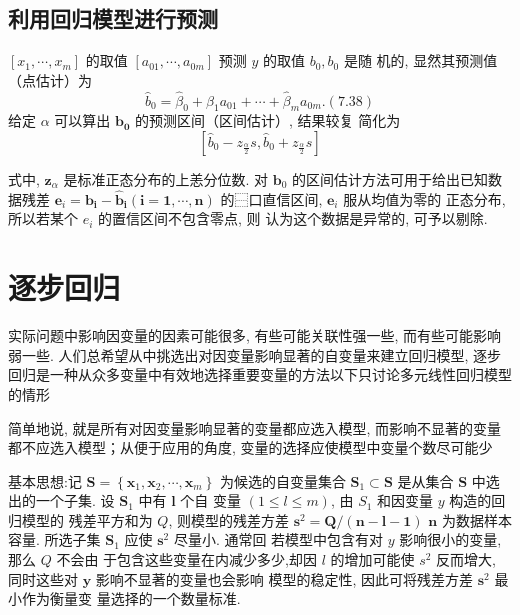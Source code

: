 \subsection{利用回归模型进行预测}

\( \left[x_{1}, \cdots, x_{m}\right] \) 的取值 \( \left[a_{01}, \cdots, a_{0 m}\right] \) 预测 \( y \) 的取值 \( b_{0}, b_{0} \) 是随 机的, 显然其预测值（点估计）为
$$
\hat{b}_{0}=\hat{\beta}_{0}+\hat{\beta}_{1} a_{01}+\cdots+\hat{\beta}_{m} a_{0 m} .(7.38)
$$
给定 \( \alpha \) 可以算出 \( \boldsymbol{b}_{\mathbf{0}} \) 的预测区间（区间估计）, 结果较复
简化为
$$
\left[\hat{b}_{0}-z_{\frac{\alpha}{2}} s, \hat{b}_{0}+z_{\frac{\alpha}{2}} s\right]
$$

式中, \( \boldsymbol{z}_{\alpha} \) 是标准正态分布的上恙分位数. 
对 \( \boldsymbol{b}_{0} \) 的区间估计方法可用于给出已知数据残差 \( \boldsymbol{e}_{i}=\boldsymbol{b}_{\boldsymbol{i}}-\hat{\boldsymbol{b}}_{\boldsymbol{i}}(\boldsymbol{i}=\mathbf{1}, \cdots, \boldsymbol{n}) \) 的⿱口直信区间, \( \boldsymbol{e}_{i} \) 服从均值为零的
正态分布, 所以若某个 \( e_{i} \) 的置信区间不包含零点, 则 认为这个数据是异常的, 可予以剔除. 

\section{逐步回归}

实际问题中影响因变量的因素可能很多, 有些可能关联性强一些, 而有些可能影响弱一些. 人们总希望从中挑选出对因变量影响显著的自变量来建立回归模型, 逐步回归是一种从众多变量中有效地选择重要变量的方法以下只讨论多元线性回归模型的情形

简单地说, 就是所有对因变量影响显著的变量都应选入模型, 而影响不显著的变量都不应选入模型；从便于应用的角度, 变量的选择应使模型中变量个数尽可能少

基本思想:记 \( \boldsymbol{S}=\left\{\boldsymbol{x}_{1}, \boldsymbol{x}_{2}, \cdots, \boldsymbol{x}_{m}\right\} \) 为候选的自变量集合
\( \boldsymbol{S}_{1} \subset \boldsymbol{S} \) 是从集合 \( \boldsymbol{S} \) 中选出的一个子集. 设 \( \boldsymbol{S}_{1} \) 中有 \( \boldsymbol{l} \) 个自
变量 \( (1 \leq l \leq m) \), 由 \( S_{1} \) 和因变量 \( y \) 构造的回归模型的 残差平方和为 \( Q \), 则模型的残差方差 \( \boldsymbol{s}^{2}=\boldsymbol{Q} /(\boldsymbol{n}-\boldsymbol{l}-\mathbf{1}) \)
\( \boldsymbol{n} \) 为数据样本容量. 所选子集 \( \boldsymbol{S}_{1} \) 应使 \( \boldsymbol{s}^{2} \) 尽量小. 通常回
若模型中包含有对 \( y \) 影响很小的变量, 那么 \( Q \) 不会由 于包含这些变量在内减少多少,却因 \( l \) 的增加可能使 \( s^{2} \) 反而增大, 同时这些对 \( \boldsymbol{y} \) 影响不显著的变量也会影响 模型的稳定性, 因此可将残差方差 \( \boldsymbol{s}^{2} \) 最小作为衡量变
量选择的一个数量标准. 

